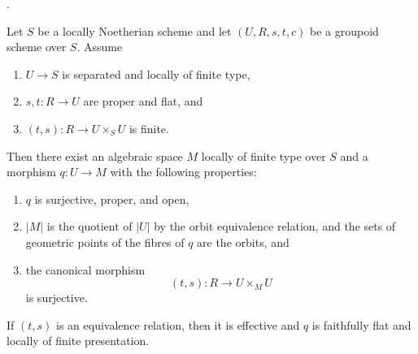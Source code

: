 \begin{proposition}
\label{proposition-proper-flat-groupoid-moduli}
\begin{reference}
\cite[Expos\'e 212, Th\'eor\`eme 6.1, pp. 112--113, and erratum,
p. 301]{FGA}.
\end{reference}
Let $S$ be a locally Noetherian scheme and let
$(U, R, s, t, c)$ be a groupoid scheme over $S$. Assume
\begin{enumerate}
\item $U \to S$ is separated and locally of finite type,
\item $s, t : R \to U$ are proper and flat, and
\item $(t, s) : R \to U \times_S U$ is finite.
\end{enumerate}
Then there exist an algebraic space $M$ locally of finite type over $S$
and a morphism $q : U \to M$ with the following properties:
\begin{enumerate}
\item $q$ is surjective, proper, and open,
\item $|M|$ is the quotient of $|U|$ by the orbit equivalence relation,
and the sets of geometric points of the fibres of $q$ are the orbits, and
\item the canonical morphism
$$
(t, s) : R \longrightarrow U \times_M U
$$
is surjective.
\end{enumerate}
If $(t, s)$ is an equivalence relation, then it is effective and
$q$ is faithfully flat and locally of finite presentation.
\end{proposition}

